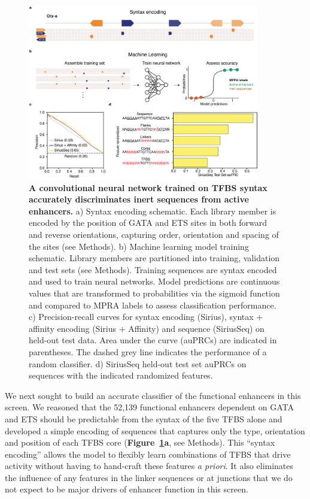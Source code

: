 \begin{figure}[p]
    \centering
    \includegraphics[width=0.9\textwidth, height=0.745\textheight]{2_figures-and-files/Fig2.png}
    \caption[A convolutional neural network trained on TFBS syntax accurately discriminates inert sequences from active enhancers.]{\textbf{A convolutional neural network trained on TFBS syntax accurately discriminates inert sequences from active enhancers.} a) Syntax encoding schematic. Each library member is encoded by the position of GATA and ETS sites in both forward and reverse orientations, capturing order, orientation and spacing of the sites (see Methods). b) Machine learning model training schematic. Library members are partitioned into training, validation and test sets (see Methods). Training sequences are syntax encoded and used to train neural networks. Model predictions are continuous values that are transformed to probabilities via the sigmoid function and compared to MPRA labels to assess classification performance. c) Precision-recall curves for syntax encoding (Sirius), syntax + affinity encoding (Sirius + Affinity) and sequence (SiriusSeq) on held-out test data. Area under the curve (auPRCs) are indicated in parentheses. The dashed grey line indicates the performance of a random classifier. d) SiriusSeq held-out test set auPRCs on sequences with the indicated randomized features.}
    \label{fig:2 Figure 2}
\end{figure}

We next sought to build an accurate classifier of the functional enhancers in this screen. We reasoned that the 52,139 functional enhancers dependent on GATA and ETS should be predictable from the syntax of the five TFBS alone and developed a simple encoding of sequences that captures only the type, orientation and position of each TFBS core (\textbf{Figure~\ref{fig:2 Figure 2}a}, see Methods). This “syntax encoding” allows the model to flexibly learn combinations of TFBS that drive activity without having to hand-craft these features \textit{a priori}. It also eliminates the influence of any features in the linker sequences or at junctions that we do not expect to be major drivers of enhancer function in this screen.

